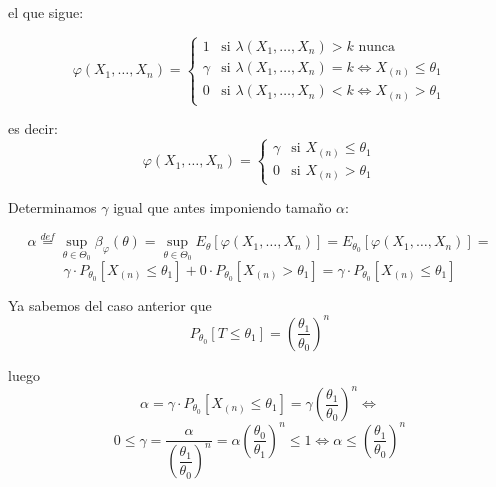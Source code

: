 \documentclass[12pt]{article}
\begin{document}
\begin{ejercicio}[1.75 puntos]
\begin{figure}[H]
        \end{figure}

        el que sigue:

        $$\varphi(X_1, \ldots, X_n) = \begin{cases}
            1 &\text{si } \lambda(X_1, \ldots, X_n) > k \text{ nunca} \\
            \gamma &\text{si } \lambda(X_1, \ldots, X_n) = k \iff X_{(n)} \leq \theta_1 \\
            0 &\text{si } \lambda(X_1, \ldots, X_n) < k \iff X_{(n)} > \theta_1
        \end{cases}$$

        es decir:
        $$\varphi(X_1, \ldots, X_n) = \begin{cases}
            \gamma &\text{si } X_{(n)} \leq \theta_1 \\
            0 &\text{si } X_{(n)} > \theta_1
        \end{cases}$$

        Determinamos $\gamma$ igual que antes imponiendo tamaño $\alpha$:

        $$\alpha \stackrel{def} = \sup_{\theta \in \Theta_0} \beta_{\varphi}(\theta) =  \sup_{\theta \in \Theta_0} E_\theta[\varphi(X_1, \ldots, X_n)] = E_{\theta_0}[\varphi(X_1, \ldots, X_n)] = $$
        $$\gamma \cdot P_{\theta_0}[X_{(n)} \leq \theta_1] + 0 \cdot P_{\theta_0}[X_{(n)} > \theta_1] = \gamma \cdot P_{\theta_0}[X_{(n)} \leq \theta_1] $$

        Ya sabemos del caso anterior que 
        $$P_{\theta_0}[T \leq \theta_1] = \left( \dfrac{\theta_1}{\theta_0} \right)^{n}$$

        luego
        $$\alpha = \gamma \cdot P_{\theta_0}[X_{(n)} \leq \theta_1] = \gamma \left( \dfrac{\theta_1}{\theta_0} \right)^{n} \iff $$
        $$0 \leq \gamma = \dfrac{\alpha}{\left( \dfrac{\theta_1}{\theta_0} \right)^{n}} = \alpha \left( \dfrac{\theta_0}{\theta_1} \right)^{n}  \leq 1 \iff \alpha \leq \left( \dfrac{\theta_1}{\theta_0} \right)^{n}$$


\end{ejercicio}
\end{document}
